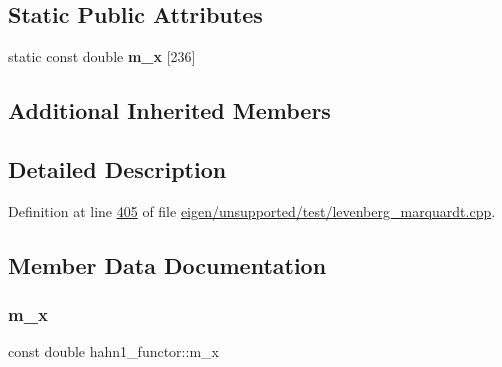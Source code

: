 \subsection*{Static Public Attributes}
\begin{DoxyCompactItemize}
\item 
static const double {\bfseries m\+\_\+x} \mbox{[}236\mbox{]}
\end{DoxyCompactItemize}
\subsection*{Additional Inherited Members}


\subsection{Detailed Description}


Definition at line \hyperlink{eigen_2unsupported_2test_2levenberg__marquardt_8cpp_source_l00405}{405} of file \hyperlink{eigen_2unsupported_2test_2levenberg__marquardt_8cpp_source}{eigen/unsupported/test/levenberg\+\_\+marquardt.\+cpp}.



\subsection{Member Data Documentation}
\mbox{\label{structhahn1__functor_afd9f20cb376e1b4feaef8a8e51184284}} 
\subsubsection{\texorpdfstring{m\+\_\+x}{m\_x}}
{\footnotesize\ttfamily const double hahn1\+\_\+functor\+::m\+\_\+x\hspace{0.3cm}{\ttfamily [static]}}

